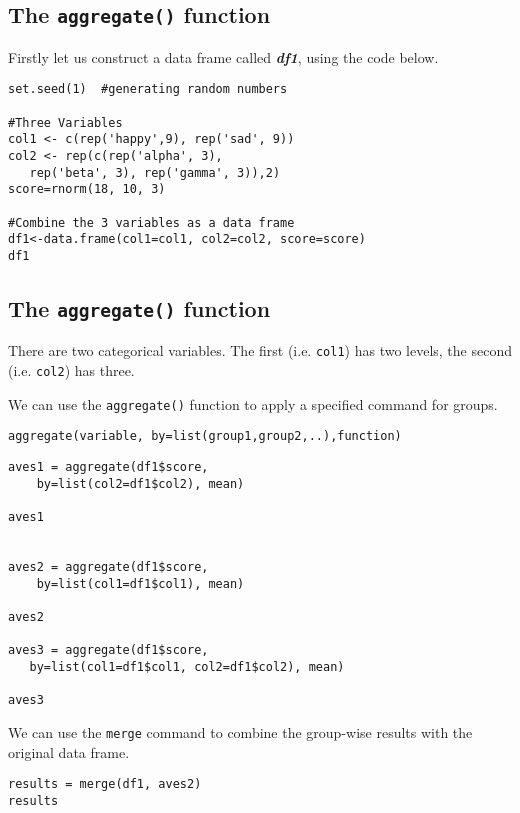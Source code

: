 \documentclass[12pt]{article}
\begin{document}
\newpage
\subsection*{The \texttt{aggregate()} function}
Firstly let us construct a data frame called \textit{\textbf{df1}}, using the code below.
\begin{framed}
\begin{verbatim}
set.seed(1)  #generating random numbers

#Three Variables
col1 <- c(rep('happy',9), rep('sad', 9)) 
col2 <- rep(c(rep('alpha', 3), 
   rep('beta', 3), rep('gamma', 3)),2) 
score=rnorm(18, 10, 3) 
 
#Combine the 3 variables as a data frame
df1<-data.frame(col1=col1, col2=col2, score=score) 
df1
\end{verbatim}
\end{framed}
\newpage
\subsection*{The \texttt{aggregate()} function}
\noindent There are two categorical variables. The first (i.e. \texttt{col1}) has two levels, the second (i.e. \texttt{col2}) has three. 


\noindent We can use the \texttt{aggregate()} function to apply a specified command for groups.
{
	\large
\begin{verbatim}
aggregate(variable, by=list(group1,group2,..),function)
\end{verbatim}

\begin{framed}
	
\begin{verbatim}
aves1 = aggregate(df1$score, 
    by=list(col2=df1$col2), mean)
    
aves1


aves2 = aggregate(df1$score, 
    by=list(col1=df1$col1), mean)
    
aves2

aves3 = aggregate(df1$score,
   by=list(col1=df1$col1, col2=df1$col2), mean)
   
aves3
\end{verbatim}
\end{framed}
}
\newpage
\noindent We can use the \texttt{merge} command to combine the group-wise results with the original data frame.
\begin{framed}
\begin{verbatim}
results = merge(df1, aves2) 
results
\end{verbatim}
\end{framed}
\end{document}
